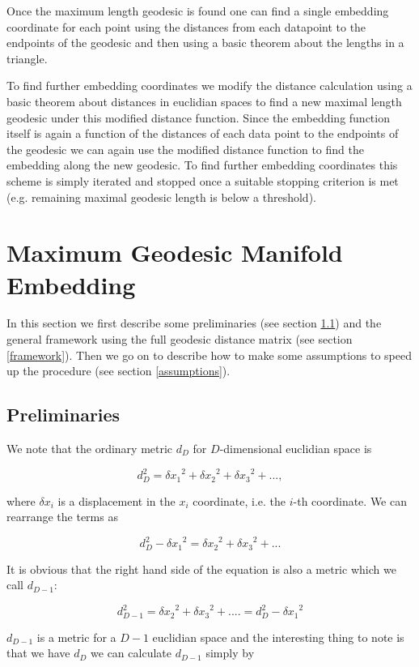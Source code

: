 \documentclass[11pt]{article}
\begin{document}
Once the maximum length geodesic is found one can find a single embedding coordinate for each point using the distances from each datapoint to the endpoints of the geodesic and then using a basic theorem about the lengths in a triangle.

To find further embedding coordinates we modify the distance calculation using a basic theorem about distances in euclidian spaces to find a new maximal length geodesic under this modified distance function. Since the embedding function itself is again a function of the distances of each data point to the endpoints of the geodesic we can again use the modified distance function to find the embedding along the new geodesic. To find further embedding coordinates this scheme is simply iterated and stopped once a suitable stopping criterion is met (e.g. remaining maximal geodesic length is below a threshold).

\section{Maximum Geodesic Manifold Embedding}

In this section we first describe some preliminaries (see section \ref{preliminaries}) and the general framework using the full geodesic distance matrix (see section \ref{framework}). Then we go on to describe how to make some assumptions to speed up the procedure (see section \ref{assumptions}).

\subsection{Preliminaries}\label{preliminaries}

We note that the ordinary metric $d_D$ for $D$-dimensional euclidian space is

\[d_D^2 = {\delta x_1}^2 + {\delta x_2}^2 + {\delta x_3}^2 + ..., \]

where $\delta x_i$ is a displacement in the $x_i$ coordinate, i.e. the $i$-th coordinate. We can rearrange the terms as 

\[d_D^2 - {\delta x_1}^2 = {\delta x_2}^2 + {\delta x_3}^2 + ...\]

It is obvious that the right hand side of the equation is also a metric which we call $d_{D-1}$:

\[d_{D-1}^2 = {\delta x_2}^2 + {\delta x_3}^2 + .... = d_D^2 - {\delta x_1}^2\]

$d_{D-1}$ is a metric for a $D-1$ euclidian space and the interesting thing to note is that we have $d_D$ we can calculate $d_{D-1}$ simply by 
\end{document}
